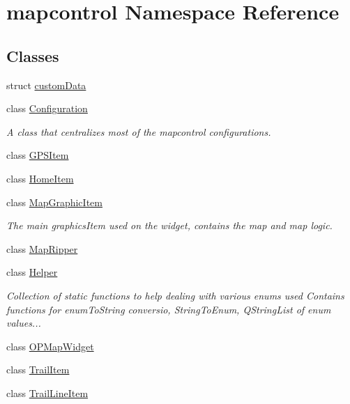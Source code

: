 \hypertarget{namespacemapcontrol}{\section{mapcontrol \-Namespace \-Reference}
\label{namespacemapcontrol}
}
\subsection*{\-Classes}
\begin{DoxyCompactItemize}
\item 
struct \hyperlink{structmapcontrol_1_1custom_data}{custom\-Data}
\item 
class \hyperlink{classmapcontrol_1_1_configuration}{\-Configuration}
\begin{DoxyCompactList}\small\item\em \-A class that centralizes most of the mapcontrol configurations. \end{DoxyCompactList}\item 
class \hyperlink{classmapcontrol_1_1_g_p_s_item}{\-G\-P\-S\-Item}
\item 
class \hyperlink{classmapcontrol_1_1_home_item}{\-Home\-Item}
\item 
class \hyperlink{classmapcontrol_1_1_map_graphic_item}{\-Map\-Graphic\-Item}
\begin{DoxyCompactList}\small\item\em \-The main graphics\-Item used on the widget, contains the map and map logic. \end{DoxyCompactList}\item 
class \hyperlink{classmapcontrol_1_1_map_ripper}{\-Map\-Ripper}
\item 
class \hyperlink{classmapcontrol_1_1_helper}{\-Helper}
\begin{DoxyCompactList}\small\item\em \-Collection of static functions to help dealing with various enums used \-Contains functions for enum\-To\-String conversio, \-String\-To\-Enum, \-Q\-String\-List of enum values... \end{DoxyCompactList}\item 
class \hyperlink{classmapcontrol_1_1_o_p_map_widget}{\-O\-P\-Map\-Widget}
\item 
class \hyperlink{classmapcontrol_1_1_trail_item}{\-Trail\-Item}
\item 
class \hyperlink{classmapcontrol_1_1_trail_line_item}{\-Trail\-Line\-Item}
\item 

\end{DoxyCompactItemize}
